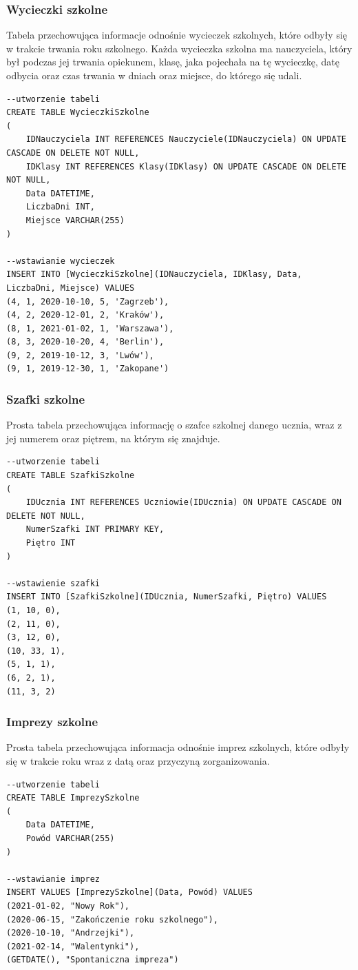 \documentclass[60pt]{article}
\begin{document}
 \subsubsection{Wycieczki szkolne}
 Tabela przechowująca informacje odnośnie wycieczek szkolnych, które odbyły się w trakcie trwania roku szkolnego. Każda wycieczka szkolna ma nauczyciela, który był podczas jej trwania opiekunem, klasę, jaka pojechała na tę wycieczkę, datę odbycia oraz czas trwania w dniach oraz miejsce, do którego się udali.
\begin{verbatim}
--utworzenie tabeli
CREATE TABLE WycieczkiSzkolne
(
	IDNauczyciela INT REFERENCES Nauczyciele(IDNauczyciela) ON UPDATE CASCADE ON DELETE NOT NULL,
	IDKlasy INT REFERENCES Klasy(IDKlasy) ON UPDATE CASCADE ON DELETE NOT NULL,
	Data DATETIME,
	LiczbaDni INT,
	Miejsce VARCHAR(255)
)

--wstawianie wycieczek
INSERT INTO [WycieczkiSzkolne](IDNauczyciela, IDKlasy, Data, LiczbaDni, Miejsce) VALUES
(4, 1, 2020-10-10, 5, 'Zagrzeb'),
(4, 2, 2020-12-01, 2, 'Kraków'),
(8, 1, 2021-01-02, 1, 'Warszawa'),
(8, 3, 2020-10-20, 4, 'Berlin'),
(9, 2, 2019-10-12, 3, 'Lwów'),
(9, 1, 2019-12-30, 1, 'Zakopane')
\end{verbatim}

 \subsubsection{Szafki szkolne}
 Prosta tabela przechowująca informację o szafce szkolnej danego ucznia, wraz z jej numerem oraz piętrem, na którym się znajduje.

\begin{verbatim}
--utworzenie tabeli
CREATE TABLE SzafkiSzkolne
(
	IDUcznia INT REFERENCES Uczniowie(IDUcznia) ON UPDATE CASCADE ON DELETE NOT NULL,
	NumerSzafki INT PRIMARY KEY,
	Piętro INT
)

--wstawienie szafki
INSERT INTO [SzafkiSzkolne](IDUcznia, NumerSzafki, Piętro) VALUES
(1, 10, 0),
(2, 11, 0),
(3, 12, 0),
(10, 33, 1),
(5, 1, 1),
(6, 2, 1),
(11, 3, 2)
\end{verbatim}

 \subsubsection{Imprezy szkolne}
Prosta tabela przechowująca informacja odnośnie imprez szkolnych, które odbyły się w trakcie roku wraz z datą oraz przyczyną zorganizowania.

\begin{verbatim}
--utworzenie tabeli
CREATE TABLE ImprezySzkolne
(
	Data DATETIME,
	Powód VARCHAR(255)
)

--wstawianie imprez
INSERT VALUES [ImprezySzkolne](Data, Powód) VALUES
(2021-01-02, "Nowy Rok"),
(2020-06-15, "Zakończenie roku szkolnego"),
(2020-10-10, "Andrzejki"),
(2021-02-14, "Walentynki"),
(GETDATE(), "Spontaniczna impreza")
\end{verbatim}
\end{document}

